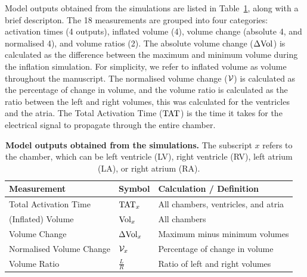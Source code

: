 Model outputs obtained from the simulations are listed in Table~\ref{tab:measurements},
along with a brief descripton. 
The 18 measurements are grouped into four categories:
activation times (4 outputs),
inflated volume (4),
volume change (absolute 4, and normalised 4), and
volume ratios (2).
The absolute volume change ($\Delta \mathrm{Vol}_{}$) is calculated as the difference between the maximum and minimum volume
during the inflation simulation.
For simplicity, we refer to inflated volume as volume throughout the manuscript.
The normalised volume change ($\mathcal{V}_{}$) is calculated as the percentage of change in volume,
and the volume ratio is calculated as the ratio between the left and right volumes, 
this was calculated for the ventricles and the atria. 
The Total Activation Time ($\mathrm{TAT}_{}$) is the time it takes for the electrical signal to propagate
through the entire chamber.

\begin{table}[hbpt]
    \centering
    \caption[Model outputs obtained from the simulations.]{
        \textbf{Model outputs obtained from the simulations.}
        The subscript $x$ refers to the chamber, which can be left ventricle (LV),
        right ventricle (RV), left atrium (LA), or right atrium (RA). 
    }
    \vspace{1em}
    \begin{tabular}{lll}
    \hline
    Measurement              & Symbol                           & Calculation / Definition                                                                                  \\
    \hline
    Total Activation Time    & $\mathrm{TAT}_{x}$                        & All chambers, ventricles, and atria                                \\
    (Inflated) Volume        & $\mathrm{Vol}_{x}$                        & All chambers                                                     \\
    Volume Change            & $\Delta \mathrm{Vol}_{x}$                 & Maximum minus minimum volumes  \\
    Normalised Volume Change & $\mathcal{V}_{x}$            & Percentage of change in volume                  \\
    Volume Ratio             & $\frac{L}{R}$ & Ratio of left and right volumes \\                            
    \hline 
    \end{tabular}    
    \label{tab:measurements}
\end{table}

